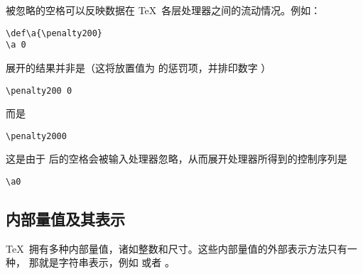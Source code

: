 \documentclass{book}
\begin{document}
被忽略的空格可以反映数据在 \TeX\ 各层处理器之间的流动情况。例如：
\begin{verbatim}
\def\a{\penalty200}
\a 0
\end{verbatim}
展开的结果{\italic 并非}是（这将放置值为  的惩罚项，并排印数字 ）
\begin{verbatim}
\penalty200 0
\end{verbatim}
而是
\begin{verbatim}
\penalty2000
\end{verbatim}
这是由于  后的空格会被输入处理器忽略，从而展开处理器所得到的控制序列是
\begin{verbatim}
\a0
\end{verbatim}

\subsection{内部量值及其表示}

\TeX\ 拥有多种内部量值，诸如整数和尺寸。这些内部量值的外部表示方法只有一种，
那就是字符串表示，例如  或者 \n{91.44cm}。
\end{document}
